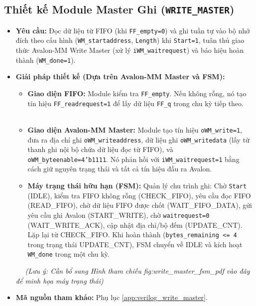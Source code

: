 \subsection{Thiết kế Module Master Ghi (\texttt{WRITE\_MASTER})}
\begin{itemize}
    \item \textbf{Yêu cầu:} Đọc dữ liệu từ FIFO (khi \texttt{FF\_empty=0}) và ghi tuần tự vào bộ nhớ đích theo cấu hình (\texttt{WM\_startaddress}, \texttt{Length}) khi \texttt{Start=1}, tuân thủ giao thức Avalon-MM Write Master (xử lý \texttt{iWM\_waitrequest}) và báo hiệu hoàn thành (\texttt{WM\_done=1}).
    \item \textbf{Giải pháp thiết kế (Dựa trên Avalon-MM Master và FSM):}
        \begin{itemize}
            \item \textbf{Giao diện FIFO:} Module kiểm tra \texttt{FF\_empty}. Nếu không rỗng, nó tạo tín hiệu \texttt{FF\_readrequest=1} để lấy dữ liệu \texttt{FF\_q} trong chu kỳ tiếp theo.
            \item \textbf{Giao diện Avalon-MM Master:} Module tạo tín hiệu \texttt{oWM\_write=1}, đưa ra địa chỉ ghi \texttt{oWM\_writeaddress}, dữ liệu ghi \texttt{oWM\_writedata} (lấy từ thanh ghi nội bộ chứa dữ liệu đọc từ FIFO), và \texttt{oWM\_byteenable=4'b1111}. Nó phản hồi với \texttt{iWM\_waitrequest=1} bằng cách giữ nguyên trạng thái và tất cả tín hiệu đầu ra Avalon.
            \item \textbf{Máy trạng thái hữu hạn (FSM):} Quản lý chu trình ghi: Chờ \texttt{Start} (IDLE), kiểm tra FIFO không rỗng (CHECK\_FIFO), yêu cầu đọc FIFO (READ\_FIFO), chờ dữ liệu FIFO được chốt (WAIT\_FIFO\_DATA), gửi yêu cầu ghi Avalon (START\_WRITE), chờ \texttt{waitrequest=0} (WAIT\_WRITE\_ACK), cập nhật địa chỉ/bộ đếm (UPDATE\_CNT). Lặp lại từ CHECK\_FIFO. Khi hoàn thành (\texttt{bytes\_remaining <= 4} trong trạng thái UPDATE\_CNT), FSM chuyển về IDLE và kích hoạt \texttt{WM\_done} trong một chu kỳ.
        \end{itemize}
\textit{(Lưu ý: Cần bổ sung Hình tham chiếu fig:write\_master\_fsm\_pdf vào đây để minh họa máy trạng thái)}
    \item \textbf{Mã nguồn tham khảo:} Phụ lục \ref{app:verilog_write_master}.
\end{itemize}

